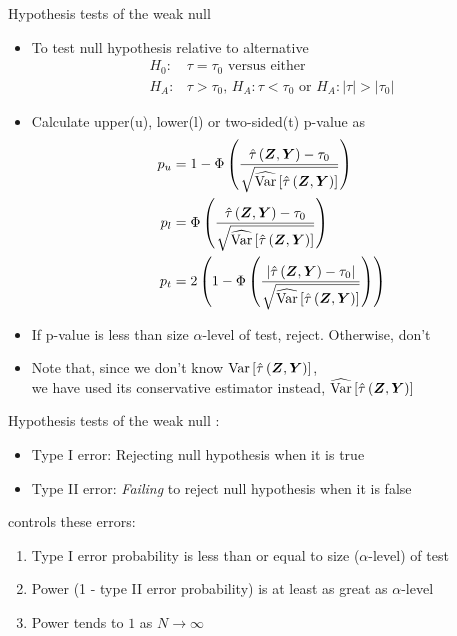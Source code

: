 \documentclass[table, xcolor = {dvipsnames}, 9pt]{beamer}
\theoremstyle{plain}
\newcommand{\bh}[1]{{\color{blue}{#1}}}
\DeclareMathOperator{\Var}{\rm{Var}}
\begin{document}
\begin{frame}{Hypothesis tests of the weak null}
\begin{itemize}
\item To test null hypothesis relative to alternative
\begin{align*}
H_0: & \tau = \tau_0 \text{ versus either } \\
H_A: & \tau > \tau_0, \, H_A: \tau < \tau_0 \text{ or } H_A: \left\lvert \tau \right\rvert > \left\lvert \tau_0 \right \rvert
\end{align*} \pause
\item Calculate upper(u), lower(l) or two-sided(t) p-value as 
\begin{align*}
p_u & =  1 - \Phi\left(\frac{\hat{\tau}\left(\bm{Z}, \bm{Y}\right) - \tau_0}{\sqrt{\widehat{\Var}\left[\hat{\tau}\left(\bm{Z}, \bm{Y}\right)\right]}}\right) \\
p_l & =  \Phi\left(\frac{\hat{\tau}\left(\bm{Z}, \bm{Y}\right) - \tau_0}{\sqrt{\widehat{\Var}\left[\hat{\tau}\left(\bm{Z}, \bm{Y}\right)\right]}}\right) \\
p_t & = 2\left(1 - \Phi\left(\frac{\left\lvert\hat{\tau}\left(\bm{Z}, \bm{Y}\right) - \tau_0\right\rvert}{\sqrt{\widehat{\Var}\left[\hat{\tau}\left(\bm{Z}, \bm{Y}\right)\right]}}\right)\right)
\end{align*} \pause
\item If p-value is less than size $\alpha$-level of test, reject. Otherwise, don't
\item Note that, since we don't know $\Var\left[\hat{\tau}\left(\bm{Z}, \bm{Y}\right)\right]$, \\ we have used its conservative estimator instead, $\widehat{\Var}\left[\hat{\tau}\left(\bm{Z}, \bm{Y}\right)\right]$
\end{itemize}
\end{frame}
\begin{frame}{Hypothesis tests of the weak null}
\bh{Hypothesis tests susceptible to two errors}:
\begin{itemize}
\item Type I error: Rejecting null hypothesis when it is true
\item Type II error: \textit{Failing} to reject null hypothesis when it is false
\end{itemize} \pause 
\bh{A good test} controls these errors:
\begin{enumerate}
\item Type I error probability is less than or equal to size ($\alpha$-level) of test
\item Power (1 - type II error probability) is at least as great as $\alpha$-level
\item Power tends to $1$ as $N \to \infty$
\end{enumerate}  
\end{frame}
\end{document}
